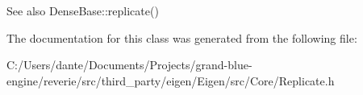 \begin{DoxySeeAlso}{See also}
Dense\+Base\+::replicate() 
\end{DoxySeeAlso}


The documentation for this class was generated from the following file\+:\begin{DoxyCompactItemize}
\item 
C\+:/\+Users/dante/\+Documents/\+Projects/grand-\/blue-\/engine/reverie/src/third\+\_\+party/eigen/\+Eigen/src/\+Core/Replicate.\+h\end{DoxyCompactItemize}
